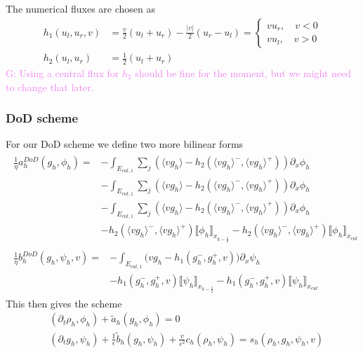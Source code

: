 \documentclass[]{article}
\newcommand{\Gunnar}[1]{\textcolor{violet}{G: }\textcolor{violet}{#1}}
\begin{document}
	The numerical fluxes are chosen as
	\begin{subequations}
\begin{align}
h_1(u_l, u_r, v) & =  \frac{v}{2} (u_l + u_r)  - \frac{|v|}{2} (u_r - u_l) =\begin{cases}
v u_r,  \quad v < 0 \\
v u_l, \quad v > 0
\end{cases} \\
h_2(u_l, u_r) & = \frac{1}{2} (u_l + u_r)
\end{align}
	\end{subequations}
	\Gunnar{Using a central flux for $h_2$ should be fine for the moment, but we might need to change that later.}
	
	\subsubsection{DoD scheme}
	
For our DoD scheme we define two more bilinear forms
\begin{subequations}
\begin{align}
	\begin{split}
\frac{1}{\eta} a_h^{DoD}(g_h, \phi_h) = & - \int_{E_{cut, 1}} \sum_{j} \left(\langle v g_h \rangle - h_2 (\langle v g_h \rangle^-, \langle v g_h \rangle^+)  \right) \partial_x \phi_h \\ 
& - \int_{E_{cut, 1}} \sum_{j} \left(\langle v g_h \rangle - h_2 (\langle v g_h \rangle^-, \langle v g_h \rangle^+)  \right) \partial_x \phi_h \\
& - \int_{E_{cut, 1}} \sum_{j} \left(\langle v g_h \rangle - h_2 (\langle v g_h \rangle^-, \langle v g_h \rangle^+)  \right) \partial_x \phi_h \\ & -  h_2 (\langle v g_h \rangle^-, \langle v g_h \rangle^+)  \llbracket \phi_h \rrbracket_{x_{k-\frac{1}{2}}} -  h_2 (\langle v g_h \rangle^-, \langle v g_h \rangle^+)  \llbracket \phi_h \rrbracket_{x_{cut}}
\end{split}\\
\begin{split}
\frac{1}{\eta}  b_h^{DoD}(g_h, \psi_h, v) = & - \int_{E_{cut, 1}} \big( v g_h - h_1(g_h^-, g_h^+, v)  \big) \partial_x \psi_h \\ & -  h_1(g_h^-, g_h^+, v)  \llbracket \psi_h \rrbracket_{x_{k-\frac{1}{2}}}  -  h_1(g_h^-, g_h^+, v) \llbracket \psi_h \rrbracket_{x_{cut}}
\end{split}
\end{align}
\end{subequations}
This then gives the scheme
\begin{subequations}
	\begin{align}
		& (\partial_t \rho_h, \phi_h) + \tilde{a}_h(g_h, \phi_h) = 0\\
		& (\partial_t g_h, \psi_h) + \frac{1}{\epsilon}\tilde{b}_h(g_h, \psi_h) + \frac{v}{\epsilon^2}c_h(\rho_h, \psi_h) = s_h(\rho_h, g_h, \psi_h, v)
	\end{align}
\end{subequations}
\end{document}

